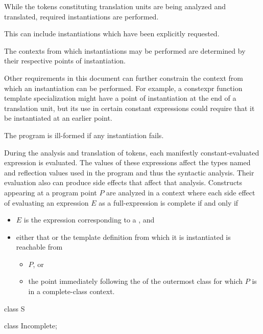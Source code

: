 \begin{enumerate}
While the tokens constituting translation units
are being analyzed and translated,
required instantiations are performed.
\begin{note}
This can include
instantiations which have been explicitly
requested.
\end{note}

The contexts from which instantiations may be performed
are determined by their respective points of instantiation.

\begin{note}
Other requirements in this document can further constrain
the context from which an instantiation can be performed.
For example, a constexpr function template specialization
might have a point of instantiation at the end of a translation unit,
but its use in certain constant expressions could require
that it be instantiated at an earlier point.
\end{note}

The program is ill-formed if any instantiation fails.

During the analysis and translation of tokens,
each manifestly constant-evaluated expression is evaluated.
The values of these expressions affect
the types named and reflection values used in the program and
thus the syntactic analysis.
Their evaluation also can produce side effects that affect that analysis.
Constructs appearing at a program point $P$ are analyzed
in a context where each side effect of evaluating an expression $E$
as a full-expression is complete if and only if
\begin{itemize}
\item
$E$ is the expression corresponding to
a , and
\item
either that  or
the template definition from which it is instantiated
is reachable from
\begin{itemize}
\item
$P$, or
\item
the point immediately following
the  of the outermost class
for which $P$ is in a complete-class context.
\end{itemize}
\end{itemize}
\begin{example}
\begin{codeblock}
class S {
  class Incomplete;

}
\end{codeblock}
\end{example}
\end{enumerate}

